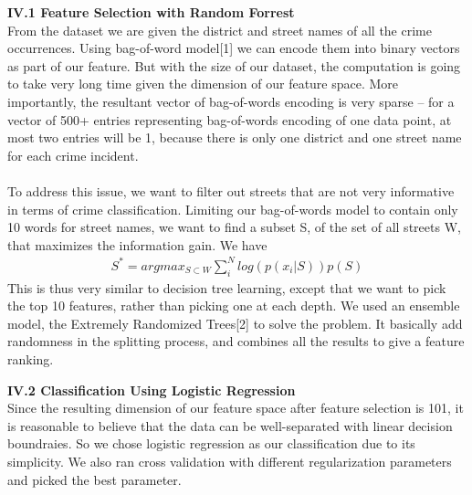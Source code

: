 \documentclass[12pt]{article}
\newenvironment{p3}[2][Part IV Methods]{\begin{trivlist}
\item[\hskip \labelsep {\bfseries #1}\hskip \labelsep {\bfseries #2}]}{\end{trivlist}}
\begin{document}
\begin{p3}{}
\item{\textbf{IV.1 Feature Selection with Random Forrest\\}}
From the dataset we are given the district and street names of all the crime occurrences. Using bag-of-word model[1] we can encode them into binary vectors as part of our feature. But with the size of our dataset, the computation is going to take very long time given the dimension of our feature space. More importantly, the resultant vector of bag-of-words encoding is very sparse -- for a vector of 500+ entries representing bag-of-words encoding of one data point, at most two entries will be 1, because there is only one district and one street name for each crime incident.\\\\
To address this issue, we want to filter out streets that are not very informative in terms of crime classification. Limiting our bag-of-words model to contain only 10 words for street names, we want to find a subset S, of the set of all streets W, that maximizes the information gain. We have
\begin{align*}
	S^* = argmax_{S \subset W} \sum_i^N log(p(x_i|S)) p(S)
\end{align*}
This is thus very similar to decision tree learning, except that we want to pick the top 10 features, rather than picking one at each depth. We used an ensemble model, the Extremely Randomized Trees[2] to solve the problem. It basically add randomness in the splitting process, and combines all the results to give a feature ranking.\\

\item{\textbf{IV.2 Classification Using Logistic Regression\\}}
Since the resulting dimension of our feature space after feature selection is 101, it is reasonable to believe that the data can be well-separated with linear decision boundraies. So we chose logistic regression as our classification due to its simplicity. We also ran cross validation with different regularization parameters and picked the best parameter.
\end{p3}
\end{document}
